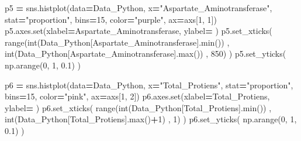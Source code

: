 \documentclass[
  11pt,
  a4paper,
]{article}
\newenvironment{Shaded}{\begin{snugshade}}{\end{snugshade}}
\newcommand{\BuiltInTok}[1]{#1}
\newcommand{\DecValTok}[1]{\textcolor[rgb]{0.00,0.00,0.81}{#1}}
\newcommand{\FloatTok}[1]{\textcolor[rgb]{0.00,0.00,0.81}{#1}}
\newcommand{\NormalTok}[1]{#1}
\newcommand{\OperatorTok}[1]{\textcolor[rgb]{0.81,0.36,0.00}{\textbf{#1}}}
\newcommand{\StringTok}[1]{\textcolor[rgb]{0.31,0.60,0.02}{#1}}
\begin{document}
\begin{Shaded}
\begin{Highlighting}[]
\NormalTok{p5 }\OperatorTok{=}\NormalTok{ sns.histplot(data}\OperatorTok{=}\NormalTok{Data\_Python, x}\OperatorTok{=}\StringTok{"Aspartate\_Aminotransferase"}\NormalTok{, stat}\OperatorTok{=}\StringTok{"proportion"}\NormalTok{, bins}\OperatorTok{=}\DecValTok{15}\NormalTok{, color}\OperatorTok{=}\StringTok{"purple"}\NormalTok{, ax}\OperatorTok{=}\NormalTok{axs[}\DecValTok{1}\NormalTok{, }\DecValTok{1}\NormalTok{])}
\NormalTok{p5.axes.}\BuiltInTok{set}\NormalTok{(xlabel}\OperatorTok{=}\StringTok{\textquotesingle{}Aspartate\_Aminotransferase\textquotesingle{}}\NormalTok{, ylabel}\OperatorTok{=}\StringTok{\textquotesingle{} \textquotesingle{}}\NormalTok{)}
\NormalTok{p5.set\_xticks( }\BuiltInTok{range}\NormalTok{(}\BuiltInTok{int}\NormalTok{(Data\_Python[}\StringTok{\textquotesingle{}Aspartate\_Aminotransferase\textquotesingle{}}\NormalTok{].}\BuiltInTok{min}\NormalTok{()) , }\BuiltInTok{int}\NormalTok{(Data\_Python[}\StringTok{\textquotesingle{}Aspartate\_Aminotransferase\textquotesingle{}}\NormalTok{].}\BuiltInTok{max}\NormalTok{()) , }\DecValTok{850}\NormalTok{) )}
\NormalTok{p5.set\_yticks( np.arange(}\DecValTok{0}\NormalTok{, }\DecValTok{1}\NormalTok{, }\FloatTok{0.1}\NormalTok{)  )}

\NormalTok{p6 }\OperatorTok{=}\NormalTok{ sns.histplot(data}\OperatorTok{=}\NormalTok{Data\_Python, x}\OperatorTok{=}\StringTok{"Total\_Protiens"}\NormalTok{, stat}\OperatorTok{=}\StringTok{"proportion"}\NormalTok{, bins}\OperatorTok{=}\DecValTok{15}\NormalTok{, color}\OperatorTok{=}\StringTok{"pink"}\NormalTok{, ax}\OperatorTok{=}\NormalTok{axs[}\DecValTok{1}\NormalTok{, }\DecValTok{2}\NormalTok{])}
\NormalTok{p6.axes.}\BuiltInTok{set}\NormalTok{(xlabel}\OperatorTok{=}\StringTok{\textquotesingle{}Total\_Protiens\textquotesingle{}}\NormalTok{, ylabel}\OperatorTok{=}\StringTok{\textquotesingle{} \textquotesingle{}}\NormalTok{)}
\NormalTok{p6.set\_xticks( }\BuiltInTok{range}\NormalTok{(}\BuiltInTok{int}\NormalTok{(Data\_Python[}\StringTok{\textquotesingle{}Total\_Protiens\textquotesingle{}}\NormalTok{].}\BuiltInTok{min}\NormalTok{()) , }\BuiltInTok{int}\NormalTok{(Data\_Python[}\StringTok{\textquotesingle{}Total\_Protiens\textquotesingle{}}\NormalTok{].}\BuiltInTok{max}\NormalTok{()}\OperatorTok{+}\DecValTok{1}\NormalTok{) , }\DecValTok{1}\NormalTok{) )}
\NormalTok{p6.set\_yticks( np.arange(}\DecValTok{0}\NormalTok{, }\DecValTok{1}\NormalTok{, }\FloatTok{0.1}\NormalTok{)  )}


\end{Highlighting}
\end{Shaded}
\end{document}

